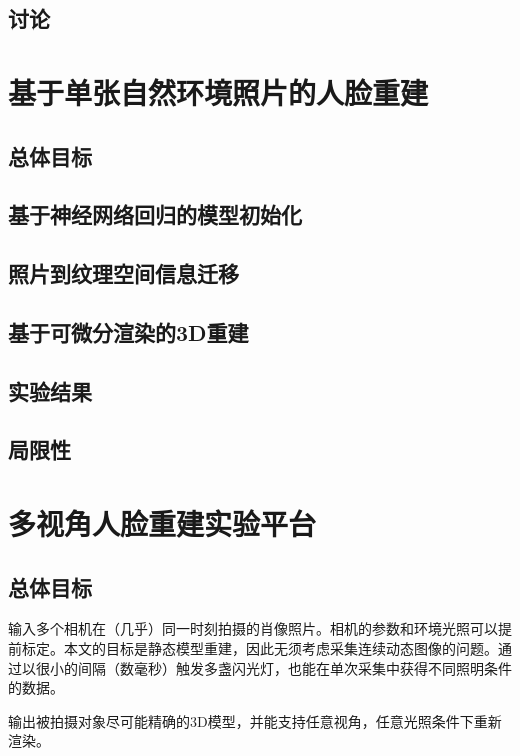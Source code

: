 \documentclass{scutmaster}
\begin{document}
\section{讨论}

\chapter{基于单张自然环境照片的人脸重建}
\label{chap:recon}

\section{总体目标}

\section{基于神经网络回归的模型初始化}

\section{照片到纹理空间信息迁移}

\section{基于可微分渲染的3D重建}

\section{实验结果}

\section{局限性}

\chapter{多视角人脸重建实验平台}
\label{chap:platform}

\section{总体目标}

输入多个相机在（几乎）同一时刻拍摄的肖像照片。相机的参数和环境光照可以提前标定。本文的目标是静态模型重建，因此无须考虑采集连续动态图像的问题。通过以很小的间隔（数毫秒）触发多盏闪光灯，也能在单次采集中获得不同照明条件的数据。

输出被拍摄对象尽可能精确的3D模型，并能支持任意视角，任意光照条件下重新渲染。
\end{document}
